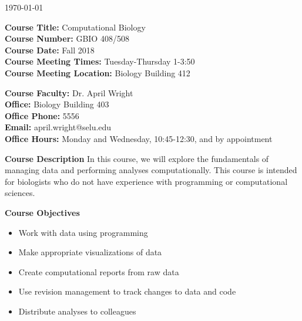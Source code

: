 \documentclass[12pt]{article}
\let\oldtextbf\textbf
\renewcommand{\textbf}[1]{\textcolor{coolblack}{\oldtextbf{#1}}}
\begin{document}
\thispagestyle{fancy}
\begin{flushright}
\today
\end{flushright}
\vspace{2mm}
\begin{flushleft}
\textbf{Course Title:} Computational Biology \\
\textbf{Course Number:} GBIO 408/508\\


\textbf{Course Date:} Fall 2018 \\

\textbf{Course Meeting Times:} Tuesday-Thursday 1-3:50 \\
\textbf{Course Meeting Location:} Biology Building 412 \\
\end{flushleft}

\bigskip

\begin{flushleft}
\textbf{Course Faculty:} Dr. April Wright \\
\textbf{Office:} Biology Building 403\\
\textbf{Office Phone:} 5556 \\
\textbf{Email:} april.wright@selu.edu   \\
\textbf{Office Hours:} Monday and Wednesday, 10:45-12:30, and by appointment \\

\end{flushleft}

\bigskip

\begin{flushleft}

\textbf{Course Description}
In this course, we will explore the fundamentals of managing data and performing analyses computationally. This course is intended for biologists who do not have experience with programming or computational sciences. 

\end{flushleft}

\bigskip
\begin{flushleft}

\textbf{Course Objectives}

\begin{itemize}

\item Work with data using programming
\item Make appropriate visualizations of data
\item Create computational reports from raw data
\item Use revision management to track changes to data and code
\item Distribute analyses to colleagues

\end{itemize}
\end{flushleft}
\end{document}
